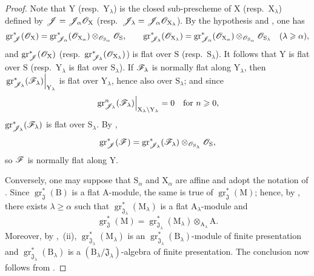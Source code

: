 \begin{proof}
Note that $\mathrm{Y}$ (resp.\ $\mathrm{Y}_\lambda$) is the closed sub-prescheme of $\mathrm{X}$ (resp.\ $\mathrm{X}_\lambda$) defined by $\mathscr{J}=\mathscr{J}_\alpha\mathscr{O}_\mathrm{X}$ (resp.\ $\mathscr{J}_\lambda=\mathscr{J}_\alpha\mathscr{O}_{\mathrm{X}_\lambda}$). By the hypothesis and , one has
\[
\operatorname{gr}^*_\mathscr{J}(\mathscr{O}_\mathrm{X})
=\operatorname{gr}^*_{\mathscr{J}_\alpha}(\mathscr{O}_{\mathrm{X}_\alpha})
 \otimes_{\mathscr{O}_{\mathrm{S}_\alpha}}\mathscr{O}_\mathrm{S},
\qquad
\operatorname{gr}^*_{\mathscr{J}_\lambda}(\mathscr{O}_{\mathrm{X}_\lambda})
=\operatorname{gr}^*_{\mathscr{J}_\alpha}(\mathscr{O}_{\mathrm{X}_\alpha})
 \otimes_{\mathscr{O}_{\mathrm{S}_\alpha}}\mathscr{O}_{\mathrm{S}_\lambda}
\quad(\lambda\geqslant\alpha),
\]
and $\operatorname{gr}^*_\mathscr{J}(\mathscr{O}_\mathrm{X})$ (resp.\ $\operatorname{gr}^*_{\mathscr{J}_\lambda}(\mathscr{O}_{\mathrm{X}_\lambda})$) is flat over $\mathrm{S}$ (resp.\ $\mathrm{S}_\lambda$). It follows that $\mathrm{Y}$ is flat over $\mathrm{S}$ (resp.\ $\mathrm{Y}_\lambda$ is flat over $\mathrm{S}_\lambda$). If $\mathscr{F}_\lambda$ is normally flat along $\mathrm{Y}_\lambda$, then $\left.\operatorname{gr}^*_{\mathscr{J}_\lambda}(\mathscr{F}_\lambda)\right|_{\mathrm{Y}_\lambda}$ is flat over $\mathrm{Y}_\lambda$, hence also over $\mathrm{S}_\lambda$; and since
\[
\left.\operatorname{gr}^n_{\mathscr{J}_\lambda}(\mathscr{F}_\lambda)\right|_{\mathrm{X}_\lambda\setminus\mathrm{Y}_\lambda}=0
\quad\text{for }n\geqslant0,
\]
$\operatorname{gr}^*_{\mathscr{J}_\lambda}(\mathscr{F}_\lambda)$ is flat over $\mathrm{S}_\lambda$. By ,
\[
\operatorname{gr}^*_\mathscr{J}(\mathscr{F})
=\operatorname{gr}^*_{\mathscr{J}_\lambda}(\mathscr{F}_\lambda)
 \otimes_{\mathscr{O}_{\mathrm{S}_\lambda}}\mathscr{O}_\mathrm{S},
\]
so $\mathscr{F}$ is normally flat along $\mathrm{Y}$.

Conversely, one may suppose that $\mathrm{S}_\alpha$ and $\mathrm{X}_\alpha$ are affine and adopt the notation of . Since $\operatorname{gr}^*_\mathfrak{J}(\mathrm{B})$ is a flat $\mathrm{A}$-module, the same is true of $\operatorname{gr}^*_\mathfrak{J}(\mathrm{M})$; hence, by , there exists $\lambda\geqslant\alpha$ such that $\operatorname{gr}^*_{\mathfrak{J}_\lambda}(\mathrm{M}_\lambda)$ is a flat $\mathrm{A}_\lambda$-module and
\[
\operatorname{gr}^*_\mathfrak{J}(\mathrm{M})
=\operatorname{gr}^*_{\mathfrak{J}_\lambda}(\mathrm{M}_\lambda)
 \otimes_{\mathrm{A}_\lambda}\mathrm{A}.
\]
Moreover, by ,~(ii), $\operatorname{gr}^*_{\mathfrak{J}_\lambda}(\mathrm{M}_\lambda)$ is an $\operatorname{gr}^*_{\mathfrak{J}_\lambda}(\mathrm{B}_\lambda)$-module of finite presentation and $\operatorname{gr}^*_{\mathfrak{J}_\lambda}(\mathrm{B}_\lambda)$ is a $(\mathrm{B}_\lambda/\mathfrak{J}_\lambda)$-algebra of finite presentation. The conclusion now follows from .
\end{proof}

